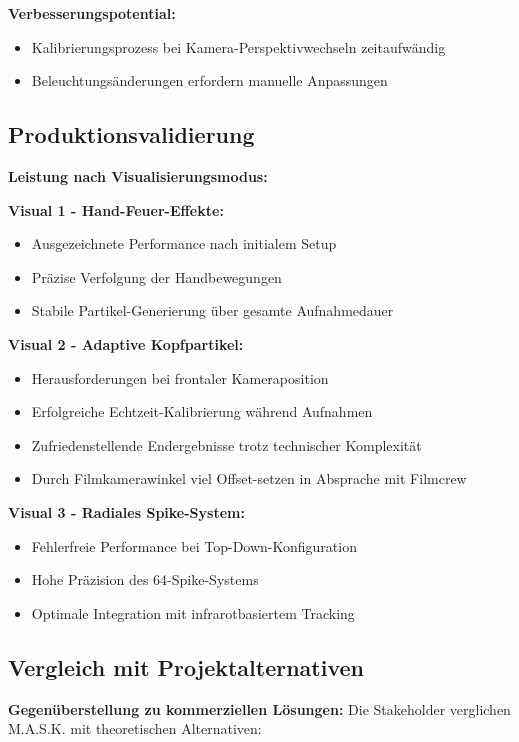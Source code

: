 \textbf{Verbesserungspotential:}
\begin{itemize}
    \item Kalibrierungsprozess bei Kamera-Perspektivwechseln zeitaufwändig
    \item Beleuchtungsänderungen erfordern manuelle Anpassungen
\end{itemize}

\subsection{Produktionsvalidierung}

\textbf{Leistung nach Visualisierungsmodus:}

\textbf{Visual 1 - Hand-Feuer-Effekte:}
\begin{itemize}
    \item Ausgezeichnete Performance nach initialem Setup
    \item Präzise Verfolgung der Handbewegungen
    \item Stabile Partikel-Generierung über gesamte Aufnahmedauer
\end{itemize}

\textbf{Visual 2 - Adaptive Kopfpartikel:}
\begin{itemize}
    \item Herausforderungen bei frontaler Kameraposition
    \item Erfolgreiche Echtzeit-Kalibrierung während Aufnahmen
    \item Zufriedenstellende Endergebnisse trotz technischer Komplexität
    \item Durch Filmkamerawinkel viel Offset-setzen in Absprache mit Filmcrew
\end{itemize}

\textbf{Visual 3 - Radiales Spike-System:}
\begin{itemize}
    \item Fehlerfreie Performance bei Top-Down-Konfiguration
    \item Hohe Präzision des 64-Spike-Systems
    \item Optimale Integration mit infrarotbasiertem Tracking
\end{itemize}

\subsection{Vergleich mit Projektalternativen}

\textbf{Gegenüberstellung zu kommerziellen Lösungen:}
Die Stakeholder verglichen M.A.S.K. mit theoretischen Alternativen:

